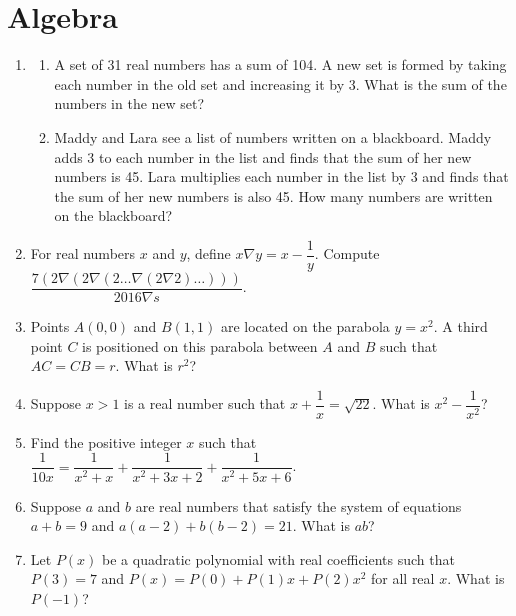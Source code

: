 \documentclass[12pt]{scrartcl}
\begin{document}
\renewcommand*\contentsname{Daftar Isi}
\tableofcontents

\newpage

\section*{Algebra}

\begin{enumerate}
    
    \item 
    \begin{enumerate}
        \item A set of 31 real numbers has a sum of 104. A new set is formed by taking each number in the old set and increasing it by 3. What is the sum of the numbers in the new set?
        \item Maddy and Lara see a list of numbers written on a blackboard. Maddy adds 3 to each number in the list and finds that the sum of her new numbers is 45. Lara multiplies each number in the list by 3 and finds that the sum of her new numbers is also 45. How many numbers are written on the blackboard?
    \end{enumerate}

    \item For real numbers $x$ and $y$, define $x \nabla y = x - \dfrac{1}{y}$. Compute $\dfrac{7(2 \nabla (2 \nabla (2 \dots \nabla (2 \nabla 2)\dots)))}{2016 \nabla s}$.

    \item Points $A(0,0)$ and $B(1,1)$ are located on the parabola $y=x^2$. A third point $C$ is positioned on this parabola between $A$ and $B$ such that $AC=CB=r$. What is $r^2$?

    \item Suppose $x>1$ is a real number such that $x + \dfrac{1}{x} = \sqrt{22}$. What is $x^2 - \dfrac{1}{x^2}$?

    \item Find the positive integer $x$ such that $\dfrac{1}{10x} = \dfrac{1}{x^2+x} + \dfrac{1}{x^2+3x+2} + \dfrac{1}{x^2+5x+6}$.

    \item Suppose $a$ and $b$ are real numbers that satisfy the system of equations $a+b=9$ and $a(a-2)+b(b-2)=21$. What is $ab$?

    \item Let $P(x)$ be a quadratic polynomial with real coefficients such that $P(3)=7$ and $P(x) = P(0) + P(1)x + P(2)x^2$ for all real $x$. What is $P(-1)$?


\end{enumerate}
\end{document}
